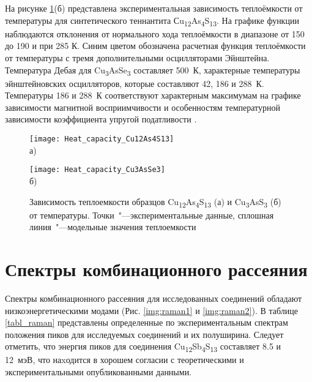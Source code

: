 На рисунке \ref{img:heat}(б) представлена экспериментальная зависимость теплоёмкости от температуры для синтетического теннантита Сu\textsubscript{12}As\textsubscript{4}S\textsubscript{13}. На графике функции наблюдаются отклонения от нормального хода теплоёмкости в диапазоне от 150 до 190 и при 285 К. Синим цветом обозначена расчетная функция теплоёмкости от температуры с тремя дополнительными осцилляторами Эйнштейна. Температура Дебая для Cu\textsubscript{3}AsSe\textsubscript{3} составляет 500~К, характерные температуры эйнштейновских осцилляторов, которые составляют 42, 186 и 288~К.   Температуры 186 и 288~К соответствуют характерным максимумам на графике зависимости магнитной восприимчивости и  особенностям температурной зависимости коэффициента упругой податливости \cite{bab_81}.

\begin{figure}[p!]
  \begin{minipage}[ht]{0.9\linewidth}\centering
    \texttt{[image: Heat\_capacity\_Cu12As4S13]} \\ а)
  \end{minipage}
  \vfill
  \begin{minipage}[ht]{0.9\linewidth}\centering
    \texttt{[image: Heat\_capacity\_Cu3AsSe3]} \\ б)
  \end{minipage}

      \caption[Зависимость теплоемкости образцов Cu\textsubscript{12}As\textsubscript{4}S\textsubscript{13} (а) и Cu\textsubscript{3}AsS\textsubscript{3} (б) от температуры. Точки~"---экспериментальные данные, сплошная линия~"---модельные значения теплоемкости]{Зависимость теплоемкости образцов Cu\textsubscript{12}As\textsubscript{4}S\textsubscript{13} (а) и Cu\textsubscript{3}AsS\textsubscript{3} (б) от температуры. Точки~"---экспериментальные данные, сплошная линия~"---модельные значения теплоемкости}
    \label{img:heat}
\end{figure}

 

\newpage

\section{Спектры комбинационного рассеяния} \label{sect3_5}

Спектры комбинационного рассеяния для исследованных соединений обладают низкоэнергетическими модами (Рис. \ref{img:raman1} и \ref{img:raman2}). 
В таблице \ref{tabl_raman} представлены определенные по экспериментальным спектрам положения пиков для исследуемых соединений и их полуширина. 
Следует отметить, что энергия пиков для соединения Cu\textsubscript{12}Sb\textsubscript{4}S\textsubscript{13} составляет 8.5  и 12~мэВ, что наxодится в хорошем согласии с теоретическими\cite{Lai_2015} и экспериментальными\cite{May2016} опубликованными данными.

